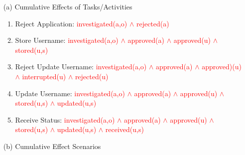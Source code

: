 \documentclass[runningheads]{llncs}
\begin{document}
\begin{itemize}
\item[(a)]{Cumulative Effects of Tasks/Activities}
\begin{enumerate}
    \item Reject Application: \textcolor{red}{investigated(a,o) $\land$ rejected(a)}
    \item Store Username: \textcolor{red}{investigated(a,o) $\land$ approved(a) $\land$ approved(u) $\land$ stored(u,s)}
    \item Reject Update Username: \textcolor{red}{investigated(a,o) $\land$ approved(a) $\land$ approved)(u) $\land$ interrupted(u) $\land$ rejected(u)}
    \item Update Username: \textcolor{red}{investigated(a,o) $\land$ approved(a) $\land$ approved(u) $\land$ stored(u,s) $\land$ updated(u,s)}
    \item Receive Status: \textcolor{red}{investigated(a,o) $\land$ approved(a) $\land$ approved(u) $\land$ stored(u,s) $\land$ updated(u,s) $\land$ received(u,s)}
    
\end{enumerate}



\newpage\item[(b)]{Cumulative Effect Scenarios}


\end{itemize}
\end{document}
